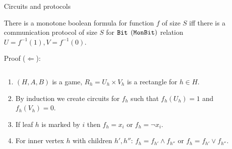 \begin{frame}{Circuits and protocols}

    \begin{theorem}[S 2016, unp.] 
        There is a monotone boolean formula for function $f$ of size $S$ iff there is a communication protocol of size $S$
        for $\mathtt{Bit}$ $(\mathtt{MonBit})$ relation $U = f^{-1}(1), V = f^{-1}(0)$.
    \end{theorem}
    
    \pause
    Proof ($\Leftarrow$):
    \begin{columns}[t]
		\begin{column}{0.65\textwidth}
            \vspace{-5mm}
            \begin{enumerate}
                \item<3-> $(H, A, B)$ is a game, $R_h = U_h \times V_h$ is a rectangle for $h \in H$.
                \item<4-> By induction we create circuits for $f_h$ such that $f_h(U_h) = 1$ and $f_h(V_h) = 0$.
                \item<5-> If leaf $h$ is marked by $i$ then $f_h = x_i$ or $f_h = \neg x_i$.
                \item<6-> For inner vertex $h$ with children $h', h''$: $f_h = f_{h'} \land f_{h''}$ or $f_h = f_{h'} \lor
                    f_{h''}$.
            \end{enumerate}
        \end{column}
        
		\begin{column}{0.35\textwidth}
		\end{column}
	\end{columns}
\end{frame}


